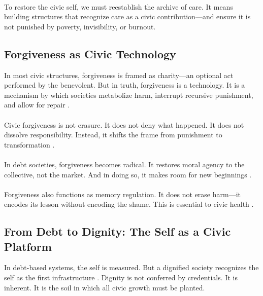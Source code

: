 \documentclass[12pt]{article}
\begin{document}
\paragraph{}To restore the civic self, we must reestablish the archive of care. It means building structures that recognize care as a civic contribution—and ensure it is not punished by poverty, invisibility, or burnout.

\subsection{Forgiveness as Civic Technology}

In most civic structures, forgiveness is framed as charity—an optional act performed by the benevolent. But in truth, forgiveness is a technology. It is a mechanism by which societies metabolize harm, interrupt recursive punishment, and allow for repair \cite{morris2014debt}.

\paragraph{}Civic forgiveness is not erasure. It does not deny what happened. It does not dissolve responsibility. Instead, it shifts the frame from punishment to transformation \cite{ahmed2004cultural}.

\paragraph{}In debt societies, forgiveness becomes radical. It restores moral agency to the collective, not the market. And in doing so, it makes room for new beginnings \cite{hooks1990yearning}.

\paragraph{}Forgiveness also functions as memory regulation. It does not erase harm—it encodes its lesson without encoding the shame. This is essential to civic health \cite{boyer2017civic}.

\subsection{From Debt to Dignity: The Self as a Civic Platform}

In debt-based systems, the self is measured. But a dignified society recognizes the self as the first infrastructure \cite{hooks1990yearning}. Dignity is not conferred by credentials. It is inherent. It is the soil in which all civic growth must be planted.
\end{document}
